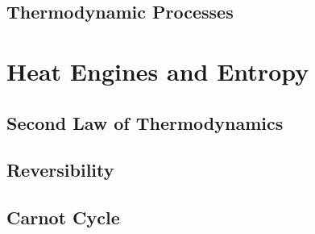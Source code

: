 \documentclass{report}
\begin{document}
\section{Thermodynamic Processes}




\chapter{Heat Engines and Entropy}
\section{Second Law of Thermodynamics}
\section{Reversibility}
\section{Carnot Cycle}
\end{document}
